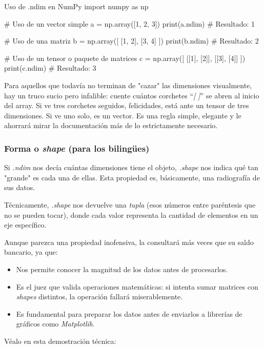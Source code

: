 \begin{pycode}{Uso de .ndim en NumPy}
import numpy as np

# Uso de un vector simple 
a = np.array([1, 2, 3])
print(a.ndim)  # Resultado: 1

# Uso de una matriz 
b = np.array([
    [1, 2],
    [3, 4]
    ])
print(b.ndim)  # Resultado: 2

# Uso de un tensor o paquete de matrices
c = np.array([
    [[1], [2]],
    [[3], [4]]
    ])
print(c.ndim)  # Resultado: 3

\end{pycode}

Para aquellos que todavía no terminan de "cazar" las dimensiones visualmente, hay un truco sucio pero infalible: cuente cuántos corchetes ``\textit{[ ]}'' se abren al inicio del array. Si ve tres corchetes seguidos, felicidades, está ante un tensor de tres dimensiones. Si ve uno solo, es un vector. Es una regla simple, elegante y le ahorrará mirar la documentación más de lo estrictamente necesario.



\subsubsection{Forma o \textit{shape} (para los bilingües)}

Si \textit{.ndim} nos decía cuántas dimensiones tiene el objeto, \textit{.shape} nos indica qué tan "grande" es cada una de ellas. Esta propiedad es, básicamente, una radiografía de sus datos.

Técnicamente, \textit{.shape} nos devuelve una \textit{tupla} (esos números entre paréntesis que no se pueden tocar), donde cada valor representa la cantidad de elementos en un eje específico.

Aunque parezca una propiedad inofensiva, la consultará más veces que su saldo bancario, ya que:
\begin{itemize}
\item Nos permite conocer la magnitud de los datos antes de procesarlos.
\item Es el juez que valida operaciones matemáticas: si intenta sumar matrices con \textit{shapes} distintos, la operación fallará miserablemente.
\item Es fundamental para preparar los datos antes de enviarlos a librerías de gráficos como \textit{Matplotlib}.
\end{itemize}

Véalo en esta demostración técnica:


